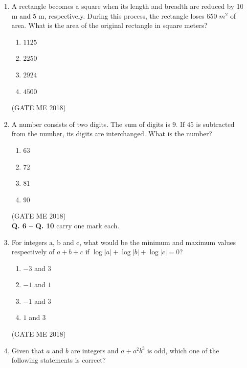 \documentclass[journal]{IEEEtran}
\numberwithin{equation}{enumi}
\numberwithin{figure}{enumi}
\begin{document}
\begin{enumerate}
\begin{multicols}{4}
\begin{enumerate}
    \item $7$
    \item $100$
    \item $700$
\end{enumerate}
\end{multicols}
 \hfill{(GATE ME 2018)}
\bigskip
\item A rectangle becomes a square when its length and breadth are reduced by 10 m and 5 m, respectively. During this process, the rectangle loses 650 $m^2$ of area. What is the area of the original rectangle in square meters?
\begin{multicols}{4}
\begin{enumerate}
    \item $1125$
    \item $2250$
    \item $2924$
    \item $4500$
\end{enumerate}
\end{multicols}
 \hfill{(GATE ME 2018)}
\bigskip
\item A number consists of two digits. The sum of digits is $9$. If $45$ is subtracted from the number, its digits are interchanged. What is the number?
\begin{multicols}{4}
\begin{enumerate}
    \item $63$
    \item $72$
    \item $81$
    \item $90$
\end{enumerate}
\end{multicols}
 \hfill{(GATE ME 2018)}
\bigskip
\\
\noindent \textbf{Q. 6 -- Q. \textbf{10}} carry one mark each.
\\
\item For integers a, b and c, what would be the minimum and maximum values respectively of $a+b+c$ if $\log|a|+\log|b|+\log|c|=0$?
\begin{multicols}{4}
\begin{enumerate}
    \item $-3$ and $3$
    \item $-1$ and $1$
    \item $-1$ and $3$
    \item $1$ and $3$
\end{enumerate}
\end{multicols}
 \hfill{(GATE ME 2018)}
\bigskip
 \item Given that $a$ and $b$ are integers and $a+a^2b^3$ is odd, which one of the following statements is correct?

\end{enumerate}
\end{document}
